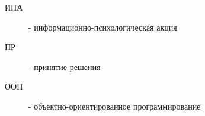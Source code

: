 \documentclass[%
master,      %
natbib,      %
subf,        %
href,        %
colorlinks,  %
]{disser}
\begin{document}
%    


    \tableofcontents

    

    
    
    

    

    \begin{description}
        \item[ИПА] - информационно-психологическая акция
        \item[ПР] - принятие решения
        \item[ООП] - объектно-ориентированное программирование
    \end{description}

%    
%    
    

    

    \appendix
    
    
\end{document}
